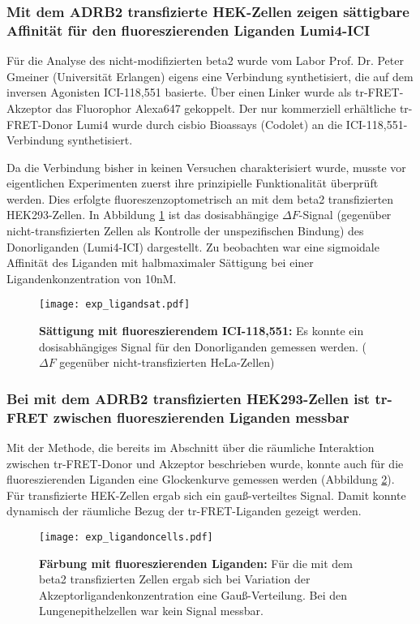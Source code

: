 \subsubsection{Mit dem ADRB2 transfizierte HEK-Zellen zeigen sättigbare Affinität für den fluoreszierenden Liganden Lumi4-ICI}

Für die Analyse des nicht-modifizierten \gls{beta2} wurde vom Labor Prof. Dr. Peter Gmeiner (Universität Erlangen) eigens eine Verbindung synthetisiert, die auf dem inversen Agonisten ICI-118,551 basierte. Über einen Linker wurde als tr-FRET-Akzeptor das Fluorophor Alexa647 gekoppelt. Der nur kommerziell erhältliche tr-FRET-Donor Lumi4 wurde durch cisbio Bioassays (Codolet) an die ICI-118,551-Verbindung synthetisiert.

Da die Verbindung bisher in keinen Versuchen charakterisiert wurde, musste vor eigentlichen Experimenten zuerst ihre prinzipielle Funktionalität überprüft werden. Dies erfolgte fluoreszenzoptometrisch an mit dem \gls{beta2} transfizierten HEK293-Zellen. In Abbildung \ref{fig:ligandsat} ist das dosisabhängige $\Delta F$-Signal (gegenüber nicht-transfizierten Zellen als Kontrolle der unspezifischen Bindung) des Donorliganden (Lumi4-ICI) dargestellt. Zu beobachten war eine sigmoidale Affinität des Liganden mit halbmaximaler Sättigung bei einer Ligandenkonzentration von 10\si{\nano M}.

\begin{figure}[htbp]
	\centering
    \texttt{[image: exp\_ligandsat.pdf]}
    \caption{\textbf{Sättigung mit fluoreszierendem ICI-118,551:} Es konnte ein dosisabhängiges Signal für den Donorliganden gemessen werden. ($\Delta F$ gegenüber nicht-transfizierten HeLa-Zellen)} 
    \label{fig:ligandsat}
\end{figure}

\subsubsection{Bei mit dem ADRB2 transfizierten HEK293-Zellen ist tr-FRET zwischen fluoreszierenden Liganden messbar}
Mit der Methode, die bereits im Abschnitt über die räumliche Interaktion zwischen tr-FRET-Donor und Akzeptor beschrieben wurde, konnte auch für die fluoreszierenden Liganden eine Glockenkurve gemessen werden (Abbildung \ref{fig:ligandoncells}). Für transfizierte HEK-Zellen ergab sich ein gauß-verteiltes Signal. Damit konnte dynamisch der räumliche Bezug der tr-FRET-Liganden gezeigt werden. 

\begin{figure}[htbp]
	\centering
    \texttt{[image: exp\_ligandoncells.pdf]}
    \caption{\textbf{Färbung mit fluoreszierenden Liganden:} Für die mit dem \gls{beta2} transfizierten Zellen ergab sich bei Variation der Akzeptorligandenkonzentration eine Gauß-Verteilung. Bei den Lungenepithelzellen war kein Signal messbar.} 
    \label{fig:ligandoncells}
\end{figure}

